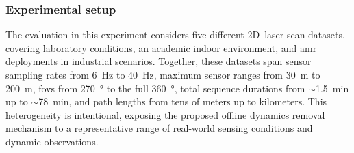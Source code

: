 \subsubsection{Experimental setup}
\label{sec:slam:results:dynamics:setup}

The evaluation in this experiment considers five different 2D~laser scan
datasets, covering laboratory conditions, an academic indoor environment, and
\gls{amr} deployments in industrial scenarios. Together, these datasets span
sensor sampling rates from \SI{6}{\hertz} to \SI{40}{\hertz},
maximum sensor ranges from \SI{30}{\metre} to \SI{200}{\metre},
\glspl{fov} from \SI{270}{\degree} to the full \SI{360}{\degree}, total sequence
durations from $\sim$\SI{1.5}{\minute} up to $\sim$\SI{78}{\minute}, and
path lengths from tens of meters up to kilometers.
This heterogeneity is intentional, exposing the proposed offline dynamics
removal mechanism to a representative range of real-world sensing conditions and
dynamic observations.

